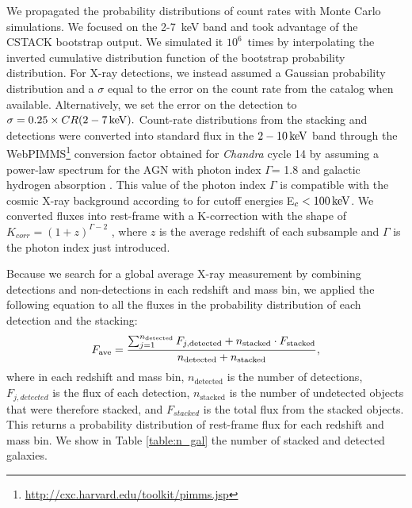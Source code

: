We propagated the probability distributions of count rates with Monte Carlo simulations. We focused on the 2-7~keV band and took advantage of the CSTACK bootstrap output. We simulated it $10^6$~times by interpolating the inverted cumulative distribution function of the bootstrap probability distribution.
For X-ray detections, we instead assumed a Gaussian probability distribution and a $\sigma$ equal to the error on the count rate from the catalog when available. Alternatively, we set the error on the detection to $\sigma=0.25 \times CR(2-7\,\mathrm{keV}).$  Count-rate distributions from the stacking and detections were converted into standard flux in the $2-10\,\mathrm{keV}$ band through the WebPIMMS\footnote{\url{http://cxc.harvard.edu/toolkit/pimms.jsp}} conversion factor obtained for \textit{Chandra} cycle 14
by assuming a power-law spectrum for the AGN with photon index $\Gamma$= 1.8 and galactic hydrogen absorption \citep[N$_H=2.6\times 10^{20} \ump{cm}{-2}$,][]{2005A&A...440..775K}.
This value of the photon index $\Gamma$ is compatible with the cosmic X-ray background according to \citet{2019ApJ...871..240A} for cutoff energies E$_c<100\,\mathrm{keV}$.
We converted fluxes into rest-frame with a K-correction with the shape of $K_{corr}=(1+z)^{\Gamma-2}$ , where $z$ is the average redshift of each subsample and $\Gamma$ is the photon index just introduced.

Because we search for a global average X-ray measurement by combining detections and non-detections in each redshift and mass bin, we applied the following equation to all the fluxes in the probability distribution of each detection and the stacking:
\begin{equation}  \label{eq:F_ave}
\centering
F_\text{ave}=\frac{\sum_{j=1}^{n_{\text{detected}}}F_{j,\text{detected}}+n_{\text{stacked}}\cdot F_{\text{stacked}}}{n_{\text{detected}}+n_{\text{stacked}}}
,\end{equation}
where in each redshift and mass bin, $n_{\text{detected}}$ is the number of detections, $F_{j,detected}$ is the flux of each detection, $n_{\text{stacked}}$ is the number of undetected objects that were therefore stacked, and $F_{stacked}$ is the total flux from the stacked objects. This returns a probability distribution of rest-frame flux for each redshift and mass bin. We show in Table \ref{table:n_gal} the number of stacked and detected galaxies.


